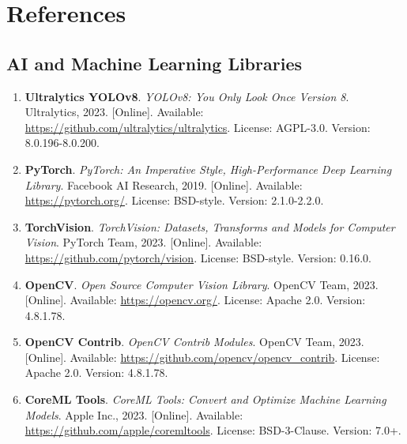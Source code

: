 
\newpage
\section*{References}

\subsection*{AI and Machine Learning Libraries}

\begin{enumerate}
    \item \textbf{Ultralytics YOLOv8}. \textit{YOLOv8: You Only Look Once Version 8}. 
    Ultralytics, 2023. [Online]. Available: \url{https://github.com/ultralytics/ultralytics}. 
    License: AGPL-3.0. Version: 8.0.196-8.0.200.
    
    \item \textbf{PyTorch}. \textit{PyTorch: An Imperative Style, High-Performance Deep Learning Library}. 
    Facebook AI Research, 2019. [Online]. Available: \url{https://pytorch.org/}. 
    License: BSD-style. Version: 2.1.0-2.2.0.
    
    \item \textbf{TorchVision}. \textit{TorchVision: Datasets, Transforms and Models for Computer Vision}. 
    PyTorch Team, 2023. [Online]. Available: \url{https://github.com/pytorch/vision}. 
    License: BSD-style. Version: 0.16.0.
    
    \item \textbf{OpenCV}. \textit{Open Source Computer Vision Library}. 
    OpenCV Team, 2023. [Online]. Available: \url{https://opencv.org/}. 
    License: Apache 2.0. Version: 4.8.1.78.
    
    \item \textbf{OpenCV Contrib}. \textit{OpenCV Contrib Modules}. 
    OpenCV Team, 2023. [Online]. Available: \url{https://github.com/opencv/opencv_contrib}. 
    License: Apache 2.0. Version: 4.8.1.78.
    
    \item \textbf{CoreML Tools}. \textit{CoreML Tools: Convert and Optimize Machine Learning Models}. 
    Apple Inc., 2023. [Online]. Available: \url{https://github.com/apple/coremltools}. 
    License: BSD-3-Clause. Version: 7.0+.
    

\end{enumerate}
